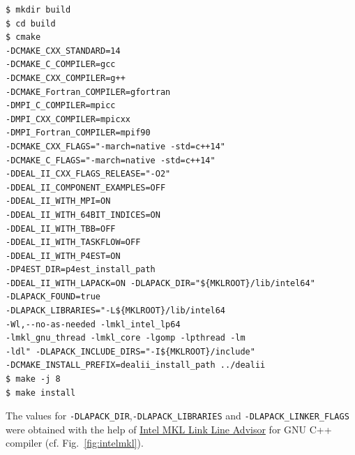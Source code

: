 \begin{verbatim}
$ mkdir build
$ cd build
$ cmake
-DCMAKE_CXX_STANDARD=14
-DCMAKE_C_COMPILER=gcc 
-DCMAKE_CXX_COMPILER=g++
-DCMAKE_Fortran_COMPILER=gfortran
-DMPI_C_COMPILER=mpicc 
-DMPI_CXX_COMPILER=mpicxx 
-DMPI_Fortran_COMPILER=mpif90
-DCMAKE_CXX_FLAGS="-march=native -std=c++14"
-DCMAKE_C_FLAGS="-march=native -std=c++14"
-DDEAL_II_CXX_FLAGS_RELEASE="-O2"
-DDEAL_II_COMPONENT_EXAMPLES=OFF
-DDEAL_II_WITH_MPI=ON
-DDEAL_II_WITH_64BIT_INDICES=ON
-DDEAL_II_WITH_TBB=OFF
-DDEAL_II_WITH_TASKFLOW=OFF 
-DDEAL_II_WITH_P4EST=ON 
-DP4EST_DIR=p4est_install_path 
-DDEAL_II_WITH_LAPACK=ON -DLAPACK_DIR="${MKLROOT}/lib/intel64"
-DLAPACK_FOUND=true
-DLAPACK_LIBRARIES="-L${MKLROOT}/lib/intel64
-Wl,--no-as-needed -lmkl_intel_lp64
-lmkl_gnu_thread -lmkl_core -lgomp -lpthread -lm
-ldl" -DLAPACK_INCLUDE_DIRS="-I${MKLROOT}/include" 
-DCMAKE_INSTALL_PREFIX=dealii_install_path ../dealii
$ make -j 8
$ make install
\end{verbatim}
The values for \verb|-DLAPACK_DIR|,\verb|-DLAPACK_LIBRARIES| and \verb|-DLAPACK_LINKER_FLAGS| were obtained with the help of \href{https://software.intel.com/en-us/articles/intel-mkl-link-line-advisor}{Intel MKL Link Line Advisor} for GNU C++ compiler (cf. Fig.~\ref{fig:intelmkl}).\\ 
